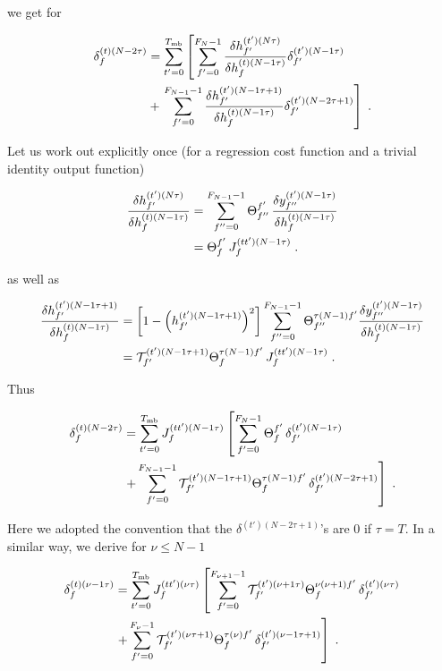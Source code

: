 \begin{subappendices}
we get for 

\begin{align}
\delta^{(t)(N-2\tau)}_f&= \sum_{t'=0}^{T_{{\rm mb}}}\left[\sum_{f'=0}^{F_{N}-1}
%
\frac{\delta h^{(t')(N\tau)}_{f'}}{\delta h^{(t)(N-1\tau)}_f }\delta^{(t')(N-1\tau)}_{f'}\right.\notag\\
%
&+\left.\sum_{f'=0}^{F_{N-1}-1}\frac{\delta h^{(t')(N-1\tau+1)}_{f'}}{\delta h^{(t)(N-1\tau)}_f }\delta^{(t')(N-2\tau+1)}_{f'}\right]\;.
\end{align}

Let us work out explicitly once (for a regression cost function and a trivial identity output function)

\begin{align}
\frac{\delta h^{(t')(N\tau)}_{f'}}{\delta h^{(t)(N-1\tau)}_f }&=\sum_{f''=0}^{F_{N-1}-1}\Theta^{f'}_{f''}\,
%
\frac{\delta y^{(t')(N-1\tau)}_{f''}}{\delta h^{(t)(N-1\tau)}_f } \notag\\
%
&=\Theta^{f'}_{f}\,J_f^{(tt')(N-1\tau)}\;.
\end{align}

as well as

\begin{align}
\frac{\delta h^{(t')(N-1\tau+1)}_{f'}}{\delta h^{(t)(N-1\tau)}_f }&=
%
\left[1-\left(h^{(t')(N-1\tau+1)}_{f'}\right)^2\right]\sum_{f''=0}^{F_{{N-1}}-1}\Theta^{\tau(N-1)f'}_{f''}
%
\frac{\delta y^{(t')(N-1\tau)}_{f''}}{\delta h^{(t)(N-1\tau)}_f }\notag\\
%
&=\mathcal{T}^{(t')(N-1\tau+1)}_{f'}\Theta^{\tau(N-1)f'}_{f}\,J_f^{(tt')(N-1\tau)}\;.
\end{align}

Thus

\begin{align}
\delta^{(t)(N-2\tau)}_f&= \sum_{t'=0}^{T_{{\rm mb}}}J_f^{(tt')(N-1\tau)}\left[\sum_{f'=0}^{F_{N}-1}
%
\Theta^{f'}_{f}\,\delta^{(t')(N-1\tau)}_{f'}\right.\notag\\
%
&\left.+\sum_{f'=0}^{F_{N-1}-1}\mathcal{T}^{(t')(N-1\tau+1)}_{f'}\Theta^{\tau(N-1)f'}_{f}\,\delta^{(t')(N-2\tau+1)}_{f'}\right]\;.
\end{align}

Here we adopted the convention that the $\delta^{(t')(N-2\tau+1)}$'s are $0$ if $\tau=T$. In a similar way, we derive for $\nu\leq N-1$

\begin{align}
\delta^{(t)(\nu-1\tau)}_f&= \sum_{t'=0}^{T_{{\rm mb}}}J^{(tt')(\nu\tau)}_f\left[\sum_{f'=0}^{F_{\nu+1}-1}
%
\mathcal{T}^{(t')(\nu+1\tau)}_{f'}\Theta^{\nu(\nu+1)f'}_{f}\,\delta^{(t')(\nu\tau)}_{f'}\right.\notag\\
%
&\left.+\sum_{f'=0}^{F_{\nu}-1}\mathcal{T}^{(t')(\nu\tau+1)}_{f'}\Theta^{\tau(\nu)f'}_{f}\,\delta^{(t')(\nu-1\tau+1)}_{f'}\right]\;.
\end{align}


\end{subappendices}
